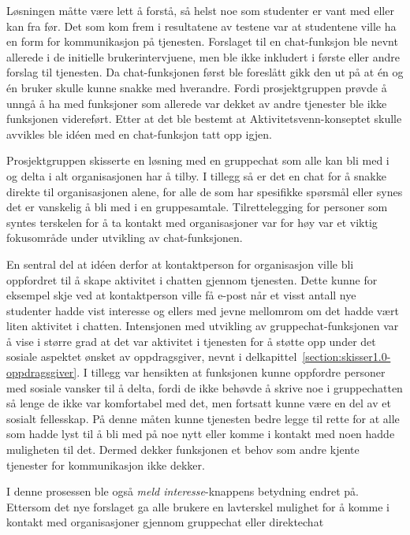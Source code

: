 Løsningen måtte være lett å forstå, så helst noe som studenter er vant med eller kan fra før. Det som kom frem i resultatene av testene var at studentene ville ha en form for kommunikasjon på tjenesten. Forslaget til en chat-funksjon ble nevnt allerede i de initielle brukerintervjuene, men ble ikke inkludert i første eller andre forslag til tjenesten. Da chat-funksjonen først ble foreslått gikk den ut på at én og én bruker skulle kunne snakke med hverandre. Fordi prosjektgruppen prøvde å unngå å ha med funksjoner som allerede var dekket av andre tjenester ble ikke funksjonen videreført. Etter at det ble bestemt at Aktivitetsvenn-konseptet skulle avvikles ble idéen med en chat-funksjon tatt opp igjen.

Prosjektgruppen skisserte en løsning med en gruppechat som alle kan bli med i og delta i alt organisasjonen har å tilby. I tillegg så er det en chat for å snakke direkte til organisasjonen alene, for alle de som har spesifikke spørsmål eller synes det er vanskelig å bli med i en gruppesamtale. Tilrettelegging for personer som syntes terskelen for å ta kontakt med organisasjoner var for høy var et viktig fokusområde under utvikling av chat-funksjonen. 

En sentral del at idéen derfor at kontaktperson for organisasjon ville bli oppfordret til å skape aktivitet i chatten gjennom tjenesten. Dette kunne for eksempel skje ved at kontaktperson ville få e-post når et visst antall nye studenter hadde vist interesse og ellers med jevne mellomrom om det hadde vært liten aktivitet i chatten. Intensjonen med utvikling av gruppechat-funksjonen var å vise i større grad at det var aktivitet i tjenesten for å støtte opp under det sosiale aspektet ønsket av oppdragsgiver, nevnt i delkapittel~\ref{section:skisser1.0-oppdragsgiver}. I tillegg var hensikten at funksjonen kunne oppfordre personer med sosiale vansker til å delta, fordi de ikke behøvde å skrive noe i gruppechatten så lenge de ikke var komfortabel med det, men fortsatt kunne være en del av et sosialt fellesskap. På denne måten kunne tjenesten bedre legge til rette for at alle som hadde lyst til å bli med på noe nytt eller komme i kontakt med noen hadde muligheten til det. Dermed dekker funksjonen et behov som andre kjente tjenester for kommunikasjon ikke dekker.

I denne prosessen ble også {\em  meld interesse}-knappens betydning endret på. Ettersom det nye forslaget ga alle brukere en lavterskel mulighet for å komme i kontakt med organisasjoner gjennom gruppechat eller direktechat


